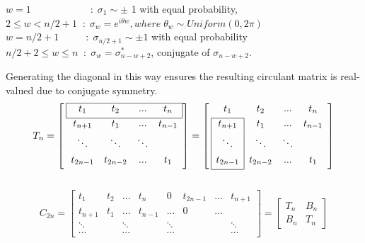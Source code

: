 	$w=1\qquad \qquad \qquad : \; \sigma_{1} \sim \pm$ 1 with equal probability,
	\\[1em]
	$2 \le w < n/2+1 \; \; : \; \sigma_{w}=e^{i\theta w}, where \; {\theta}_{w} \sim Uniform(0,2\pi) $
	\\[1em]
	$w=n/2+1 \qquad \; \; \, : \; \sigma_{n/2+1} \sim \pm 1 $ with equal probability 
	\\[1em]
	
	$n/2+2 \le w \le n \; \; : \; \sigma_{w}=\sigma^{*}_{n-w+2}$, conjugate of  $\sigma_{n-w+2}$.
	
	$$
	$$
	Generating the diagonal in this way ensures the resulting circulant matrix is real-valued due 
	to conjugate symmetry.
	$$
	T_{n} = \left[ \: 
	\begin{array}{*{4}{c}}
	\cline{1-4}
	\multicolumn{1}{|c}{t_{1}} & t_{2} & ...& \multicolumn{1}{c|}{t_{n}}           \\[0.3em]
	\cline{1-4}
	t_{n+1} & t_{1} & ... & t_{n-1} \\[0.3em]
	\ddots &\ddots & \ddots &    \\[0.3em]
	t_{2n-1} & t_{2n-2} & ... & t_{1}      \\[0.3em]    
	\end{array}
	\right]
	=
	\left[ \:
	\begin{array}{*{4}{c}}
	t_{1} & t_{2} & ...& t_{n}        \\[0.3em]
	\cline{1-1}
	\multicolumn{1}{|c|}{t_{n+1}} & t_{1} & ... & t_{n-1} \\[0.3em]
	\multicolumn{1}{|c|}{\ddots} & \ddots & \ddots &    \\[0.3em]
	\multicolumn{1}{|c|}{t_{2n-1}} & t_{2n-2} & ... & t_{1}          \\[0.3em]
	\cline{1-1}
	\end{array}
	\right]
	$$
	\\
	$$
	C_{2n} =\begin{bmatrix}
	t_{1}   & t_{2} & ...    & t_{n}  & 0   & t_{2n-1} & ... &  t_{n+1}   \\[0.3em]
	t_{n+1} & t_{1} & ...    & t_{n-1}& ... & 0  & ... &          \\[0.3em]
	\ddots  &       & \ddots &        & \ddots & & &\ddots    \\[0.3em]
	\cdots  &       & \cdots &       & \cdots & & & \cdots
	\end{bmatrix}
	=
	\begin{bmatrix}
	T_{n} & B_{n}            \\[0.3em]
	B_{n} & T_{n}   
	\end{bmatrix}
	$$
	
